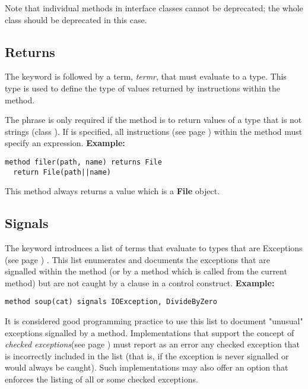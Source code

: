 Note that individual methods in interface classes cannot be
deprecated; the whole class should be deprecated in this case.
\subsection{Returns}
 
The  keyword is followed by a term, \emph{termr},
that must evaluate to a type.
This type is used to define the type of values returned by
 instructions within the method.
 
The  phrase is only required if the method is to return
values of a type that is not \nr{} strings (class ).
If  is specified, all
  instructions (see page \pageref{refreturn})  within the method must
specify an expression.
 \textbf{Example:}
\begin{lstlisting}
method filer(path, name) returns File
  return File(path||name)
\end{lstlisting}
This method always returns a value which is a \textbf{File} object.
\subsection{Signals}
 
The  keyword introduces a list of terms that evaluate to
types that are  Exceptions (see page \pageref{refexcep}) .
This list enumerates and documents the exceptions that are signalled
within the method (or by a method which is called from the current
method) but are not caught by a  clause in a control
construct.
 \textbf{Example:}
\begin{lstlisting}
method soup(cat) signals IOException, DivideByZero
\end{lstlisting}
 
It is considered good programming practice to use this list to document
"unusual" exceptions signalled by a method.
Implementations that support the concept of \emph{checked exceptions}(see page \pageref{refchecked}) must report as an error any checked exception that is
incorrectly included in the list (that is, if the exception is never
signalled or would always be caught).  Such implementations may also
offer an option that enforces the listing of all or some checked
exceptions.
